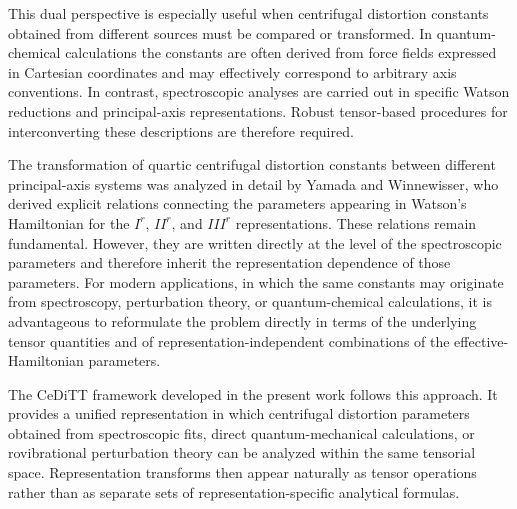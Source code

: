 This dual perspective is especially useful when centrifugal distortion
constants obtained from different sources must be compared or
transformed. In quantum-chemical calculations the constants are often
derived from force fields expressed in Cartesian coordinates and may
effectively correspond to arbitrary axis conventions. In contrast,
spectroscopic analyses are carried out in specific Watson reductions
and principal-axis representations. Robust tensor-based procedures for
interconverting these descriptions are therefore required.

The transformation of quartic centrifugal distortion constants between
different principal-axis systems was analyzed in detail by Yamada and
Winnewisser,\cite{Yamada1976} who derived explicit relations connecting
the parameters appearing in Watson's Hamiltonian for the $I^r$, $II^r$,
and $III^r$ representations. These relations remain fundamental.
However, they are written directly at the level of the spectroscopic
parameters and therefore inherit the representation dependence of
those parameters. For modern applications, in which the same constants
may originate from spectroscopy, perturbation theory, or
quantum-chemical calculations, it is advantageous to reformulate the
problem directly in terms of the underlying tensor quantities and of
representation-independent combinations of the effective-Hamiltonian
parameters.\cite{Kirschner1983}

The CeDiTT framework developed in the present work follows this
approach. It provides a unified representation in which centrifugal
distortion parameters obtained from spectroscopic fits, direct
quantum-mechanical calculations, or rovibrational perturbation theory
can be analyzed within the same tensorial space. Representation
transforms then appear naturally as tensor operations rather than as
separate sets of representation-specific analytical formulas.
